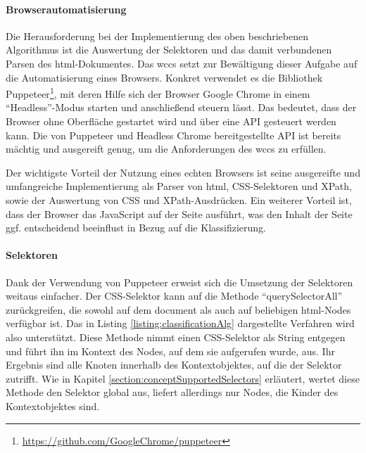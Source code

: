     \paragraph{Browserautomatisierung}
    Die Herausforderung bei der Implementierung des oben beschriebenen Algorithmus
    ist die Auswertung der Selektoren und das damit verbundenen Parsen des \gls{html}-Dokumentes.
    Das \gls{wccs} setzt zur Bewältigung dieser Aufgabe auf die Automatisierung eines Browsers.
    Konkret verwendet es die Bibliothek
    Puppeteer\footnote{\url{https://github.com/GoogleChrome/puppeteer}},
    mit deren Hilfe sich der Browser Google Chrome in einem "`Headless"'-Modus starten und anschließend steuern lässt.
    Das bedeutet, dass der Browser ohne Oberfläche gestartet wird und über eine API gesteuert werden kann.
    Die von Puppeteer und Headless Chrome bereitgestellte API ist bereits mächtig und ausgereift genug,
    um die Anforderungen des \gls{wccs} zu erfüllen.

    Der wichtigste Vorteil der Nutzung eines echten Browsers ist seine ausgereifte und umfangreiche Implementierung
    als Parser von \gls{html}, CSS-Selektoren und XPath, sowie der Auswertung von CSS und XPath-Ausdrücken.
    Ein weiterer Vorteil ist, dass der Browser das JavaScript auf der Seite ausführt,
    was den Inhalt der Seite ggf. entscheidend beeinflust in Bezug auf die Klassifizierung.

    \paragraph{Selektoren}
    Dank der Verwendung von Puppeteer erweist sich die Umsetzung der Selektoren weitaus einfacher.
    Der CSS-Selektor kann auf die Methode "`querySelectorAll"' zurückgreifen,
    die sowohl auf dem document als auch auf beliebigen \gls{html}-Nodes verfügbar ist.
    Das in Listing \ref{listing:classificationAlg} dargestellte Verfahren wird also unterstützt.
    Diese Methode nimmt einen CSS-Selektor als String entgegen und führt ihn im Kontext des
    Nodes, auf dem sie aufgerufen wurde, aus.
    Ihr Ergebnis sind alle Knoten innerhalb des Kontextobjektes,
    auf die der Selektor zutrifft.
    Wie in Kapitel \ref{section:conceptSupportedSelectors} erläutert,
    wertet diese Methode den Selektor global aus, liefert allerdings nur Nodes,
    die Kinder des Kontextobjektes sind.

